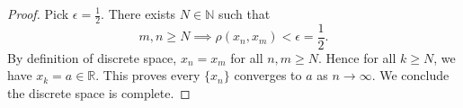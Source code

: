 \begin{Exercise}
\begin{proof}
Pick $\epsilon = \frac{1}{2}$. There exists $N\in\mathbb{N}$ such that 
$$
m,n\geq N \implies \rho(x_n,x_m)<\epsilon = \frac{1}{2}.
$$
By definition of discrete space, $x_n = x_m$ for all $n,m\geq N$. Hence for all $k\geq N$, we have $x_k=a\in\mathbb{R}$. This proves every $\{x_n\}$ converges to $a$ as $n\to\infty$. We conclude the discrete space is complete.
\end{proof}
\end{Exercise}